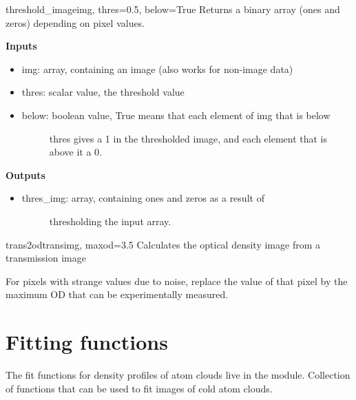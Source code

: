 \documentclass[letterpaper,10pt,english]{manual}
\begin{document}
\hypertarget{imageprocess.threshold_image}{}\begin{funcdesc}{threshold\_image}{img, thres=0.5, below=True}
Returns a binary array (ones and zeros) depending on pixel values.

\textbf{Inputs}
\begin{itemize}
\item {} 
img: array, containing an image (also works for non-image data)

\item {} 
thres: scalar value, the threshold value

\item {} \begin{description}
\item[below: boolean value, True means that each element of img that is below]
thres gives a 1 in the thresholded image, and each element that
is above it a 0.

\end{description}

\end{itemize}

\textbf{Outputs}
\begin{itemize}
\item {} \begin{description}
\item[thres\_img: array, containing ones and zeros as a result of]
thresholding the input array.

\end{description}

\end{itemize}
\end{funcdesc}

\hypertarget{imageprocess.trans2od}{}\begin{funcdesc}{trans2od}{transimg, maxod=3.5}
Calculates the optical density image from a transmission image

For pixels with strange values due to noise, replace the value of that pixel
by the maximum OD that can be experimentally measured.
\end{funcdesc}

\resetcurrentobjects


\section{Fitting functions}

The fit functions for density profiles of atom clouds live in the \hyperlink{module-fitfuncs}{} module.
\modulesynopsis{}
Collection of functions that can be used to fit images of cold atom clouds.
\end{document}
